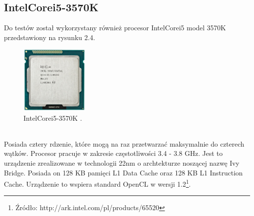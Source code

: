 \subsection{Intel\textregistered Core\texttrademark i5-3570K}
Do testów został wykorzystany również procesor Intel\textregistered Core\texttrademark i5 model 3570K przedstawiony na rysunku 2.4. 
\begin{figure}[h]
\centering
\includegraphics[width=0.3\textwidth]{figures/intel.jpg}
\caption{Intel\textregistered Core\texttrademark i5-3570K \protect\footnotemark.}%
\label{rys:Intel Core i5-3570K}
\end{figure}
\\Posiada cztery rdzenie, które mogą na raz przetwarzać maksymalnie do czterech wątków. Procesor pracuje w zakresie częstotliwości 3.4 - 3.8 GHz. Jest to urządzenie zrealizowane w technologii 22nm o archtekturze noszącej nazwę Ivy Bridge. Posiada on 128 KB pamięci L1 Data Cache oraz 128 KB L1 Instruction Cache. Urządzenie to wspiera standard OpenCL w wersji 1.2\footnote{Źródło: http://ark.intel.com/pl/products/65520}.
